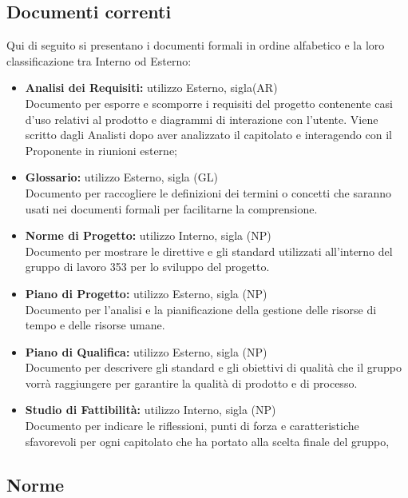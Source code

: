 \documentclass[NormeDiProgetto.tex]{subfiles}
\begin{document}
	\subsection{Documenti correnti}
	Qui di seguito si presentano i documenti formali in ordine alfabetico e la loro classificazione tra Interno od Esterno:
	\begin{itemize}
		\item \textbf{Analisi dei Requisiti:} utilizzo Esterno, sigla(AR) \\
		 Documento per esporre e scomporre i requisiti del progetto contenente casi d'uso relativi al prodotto e diagrammi di interazione con l'utente. Viene scritto dagli Analisti dopo aver analizzato il capitolato e interagendo con il Proponente in riunioni esterne;
		
		\item \textbf{Glossario:}
		utilizzo Esterno, sigla (GL) \\
		Documento per raccogliere le definizioni dei termini o concetti che saranno usati nei documenti formali per facilitarne la comprensione.
		
		\item \textbf{Norme di Progetto:}
		utilizzo Interno, sigla (NP) \\
		Documento per mostrare le direttive e gli standard utilizzati all'interno del gruppo di lavoro 353
		per lo sviluppo del progetto.
		
		\item \textbf{Piano di Progetto:}
		utilizzo Esterno, sigla (NP) \\
		Documento per l'analisi e la pianificazione della gestione delle risorse di tempo e delle risorse umane.
		
		\item \textbf{Piano di Qualifica:}
		utilizzo Esterno, sigla (NP) \\
		Documento per descrivere gli standard e gli obiettivi di qualità che il gruppo vorrà raggiungere per garantire la qualità di prodotto e di processo.
		
		\item \textbf{Studio di Fattibilità:}
		utilizzo Interno, sigla (NP) \\
		Documento per indicare le riflessioni, punti di forza e caratteristiche sfavorevoli per ogni capitolato che ha portato alla scelta finale del gruppo, 
		
	\end{itemize}
	
	\subsection{Norme}
\end{document}
